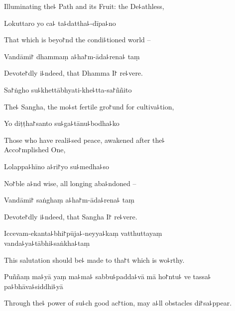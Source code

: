 \begin{english}
  Illuminating the꜕ Path and its Fruit: the De꜕athless,
\end{english}

Lokuttaro yo ca꜕ ta꜕dattha꜕-dīpa꜕no

\begin{english}
  That which is beyo꜓nd the condi꜕tioned world --
\end{english}

Vandāmi꜓ dhammaṃ a꜕ha꜓m-āda꜕rena꜕ taṃ

\begin{english}
  Devote꜓dly i꜕ndeed, that Dhamma I꜓ re꜕vere.
\end{english}

Sa꜓ṅgho su꜕khettābhyati-khe꜕tta-sa꜓ññito

\begin{english}
  The꜕ Sangha, the mo꜕st fertile gro꜓und for cultiva꜕tion,
\end{english}

Yo diṭṭha꜓santo su꜕ga꜕tānu꜕bodha꜕ko

\begin{english}
  Those who have reali꜕sed peace, awakened after the꜕ \\Acco꜓mplished One,
\end{english}

Lolappa꜕hīno a꜕ri꜓yo su꜕medha꜕so

\begin{english}
  No꜓ble a꜕nd wise, all longing aba꜕ndoned --
\end{english}

Vandāmi꜓ saṅghaṃ a꜕ha꜓m-āda꜕rena꜕ taṃ

\begin{english}
  Devote꜓dly i꜕ndeed, that Sangha I꜓ re꜕vere.
\end{english}

Iccevam-ekanta꜕bhi꜓pūja꜕-neyya꜕kaṃ vatthuttayaṃ \\vanda꜕ya꜕tābhi꜕saṅkha꜕taṃ

\begin{english}
  This salutation should be꜕ made to tha꜓t which is wo꜕rthy.
\end{english}

Puññaṃ ma꜕yā yaṃ ma꜕ma꜕ sabbu꜕padda꜕vā mā ho꜓ntu꜕ ve tassa꜕ pa꜕bhāva꜕siddhi꜕yā

\begin{english}
  Through the꜕ power of su꜕ch good ac꜓tion, may a꜕ll obstacles di꜓sa꜕ppear.
\end{english}

